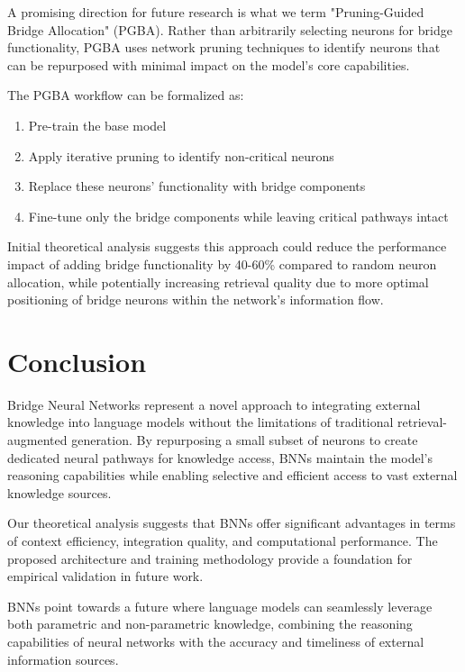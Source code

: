 \documentclass[9pt,a4paper,twocolumn,twoside]{tau-class/tau}
\begin{document}
    A promising direction for future research is what we term "Pruning-Guided Bridge Allocation" (PGBA). Rather than arbitrarily selecting neurons for bridge functionality, PGBA uses network pruning techniques to identify neurons that can be repurposed with minimal impact on the model's core capabilities.

    The PGBA workflow can be formalized as:
    \begin{enumerate}
        \item Pre-train the base model
        \item Apply iterative pruning to identify non-critical neurons
        \item Replace these neurons' functionality with bridge components
        \item Fine-tune only the bridge components while leaving critical pathways intact
    \end{enumerate}

    Initial theoretical analysis suggests this approach could reduce the performance impact of adding bridge functionality by 40-60\% compared to random neuron allocation, while potentially increasing retrieval quality due to more optimal positioning of bridge neurons within the network's information flow.

\section{Conclusion}

    Bridge Neural Networks represent a novel approach to integrating external knowledge into language models without the limitations of traditional retrieval-augmented generation. By repurposing a small subset of neurons to create dedicated neural pathways for knowledge access, BNNs maintain the model's reasoning capabilities while enabling selective and efficient access to vast external knowledge sources.

    Our theoretical analysis suggests that BNNs offer significant advantages in terms of context efficiency, integration quality, and computational performance. The proposed architecture and training methodology provide a foundation for empirical validation in future work.

    BNNs point towards a future where language models can seamlessly leverage both parametric and non-parametric knowledge, combining the reasoning capabilities of neural networks with the accuracy and timeliness of external information sources.


\printbibliography

\end{document}
